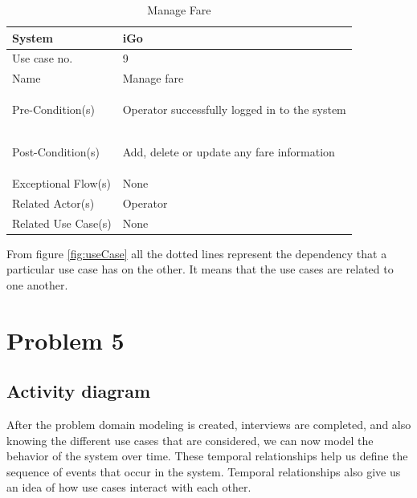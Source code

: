 \documentclass{article}
\begin{document}
\begin{table}[ht]
    \centering
    \begin{tabular}{|l|p{11cm}|}
         \hline
         System& iGo\\
         \hline
         Use case no. & 9 \\
         \hline
         Name & Manage fare \\
         \hline
         Pre-Condition(s)   & 
         \begin{enumerate*}[itemjoin=\newline]
             \item Operator successfully logged in to the system
         \end{enumerate*} \\
         \hline
         Post-Condition(s)  & 
         \begin{enumerate*}[itemjoin=\newline]
             \item Add, delete or update any  fare information
         \end{enumerate*} \\
         \hline
         Exceptional Flow(s)& None\\
         \hline
         Related Actor(s)   & Operator\\
         \hline
         Related Use Case(s)& None\\
         \hline
    \end{tabular}
    \caption{Manage Fare}
    \label{tab:UC_fare}
\end{table}
\pagebreak
From figure \ref{fig:useCase} all the dotted lines represent the dependency that a particular use case has on the other. It means that the use cases are related to one another.  
\pagebreak
 \section{Problem 5}
 \subsection{Activity diagram}
 After the problem domain modeling is created, interviews are completed, and also knowing the different use cases that are considered, we can now model the behavior of the system over time. These temporal relationships help us define the sequence of events that occur in the system. Temporal relationships also give us an idea of how use cases interact with each other. 
\end{document}
